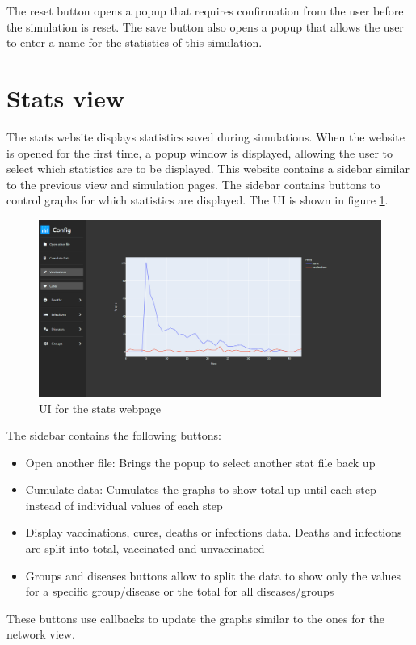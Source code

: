 The reset button opens a popup that requires confirmation from the user before the simulation is  reset. The save button also opens a popup that allows the user to enter a name for the statistics of this simulation.

\section{Stats view}
The stats website displays statistics saved during simulations. When the website is opened for the first time, a popup window is displayed, allowing the user to select which statistics are to be displayed. This website contains a sidebar similar to the previous view and simulation pages. The sidebar contains buttons to control graphs for which statistics are displayed. The UI is shown in figure \ref{fig:web_stats_view}.

\begin{figure}
    \centering
    \includegraphics[width=0.5\linewidth]{images/web_stats_view.png}
    \caption{UI for the stats webpage}
    \label{fig:web_stats_view}
\end{figure}

The sidebar contains the following buttons:
\begin{itemize}
    \item Open another file: Brings the popup to select another stat file back up
    \item Cumulate data: Cumulates the graphs to show total up until each step instead of individual values of each step
    \item Display vaccinations, cures, deaths or infections data. Deaths and infections are split
    into total, vaccinated and unvaccinated
    \item Groups and diseases buttons allow to split the data to show only the values for a specific group/disease
    or the total for all diseases/groups
\end{itemize}
These buttons use callbacks to update the graphs similar to the ones for the network view.

